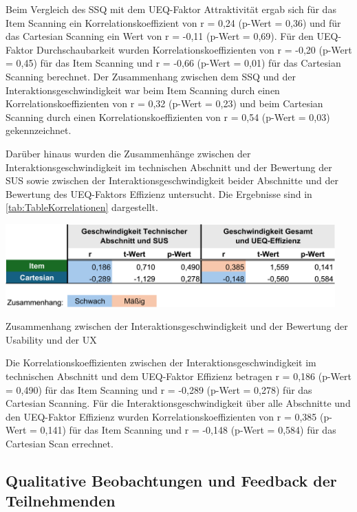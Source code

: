 Beim Vergleich des SSQ mit dem UEQ-Faktor Attraktivität ergab sich für das Item Scanning ein Korrelationskoeffizient von r = 0,24 (p-Wert = 0,36) und für das Cartesian Scanning ein Wert von r = -0,11 (p-Wert = 0,69). Für den UEQ-Faktor Durchschaubarkeit wurden Korrelationskoeffizienten von r = -0,20 (p-Wert = 0,45) für das Item Scanning und r = -0,66 (p-Wert = 0,01) für das Cartesian Scanning berechnet. Der Zusammenhang zwischen dem SSQ und der Interaktionsgeschwindigkeit war beim Item Scanning durch einen Korrelationskoeffizienten von r = 0,32 (p-Wert = 0,23) und beim Cartesian Scanning durch einen Korrelationskoeffizienten von r = 0,54 (p-Wert = 0,03) gekennzeichnet.

Darüber hinaus wurden die Zusammenhänge zwischen der Interaktionsgeschwindigkeit im technischen Abschnitt und der Bewertung der SUS sowie zwischen der Interaktionsgeschwindigkeit beider Abschnitte und der Bewertung des UEQ-Faktors Effizienz untersucht. Die Ergebnisse sind in \autoref{tab:TableKorrelationen} dargestellt. 

\begin{table}[tbh]
    \centering
    \includegraphics[width=0.95\textwidth]{images/Results/Korrelationen-Rest.png}
    \caption{Zusammenhang zwischen der Interaktionsgeschwindigkeit und der Bewertung der Usability und der UX}
    \label{tab:TableKorrelationen}
\end{table}

Die Korrelationskoeffizienten zwischen der Interaktionsgeschwindigkeit im technischen Abschnitt und dem UEQ-Faktor Effizienz betragen r = 0,186 (p-Wert = 0,490) für das Item Scanning und r = -0,289 (p-Wert = 0,278) für das Cartesian Scanning. Für die Interaktionsgeschwindigkeit über alle Abschnitte und den UEQ-Faktor Effizienz wurden Korrelationskoeffizienten von r = 0,385 (p-Wert = 0,141) für das Item Scanning und r = -0,148 (p-Wert = 0,584) für das Cartesian Scan errechnet.

\subsection{Qualitative Beobachtungen und Feedback der Teilnehmenden}

